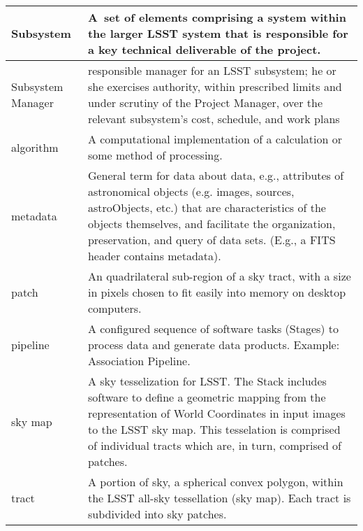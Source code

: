 \begin{longtable}{|l|p{}|}
Subsystem & A set of elements comprising a system within the larger LSST system that is responsible for a key technical deliverable of the project. \\\hline
Subsystem Manager & responsible manager for an LSST subsystem; he or she exercises authority, within prescribed limits and under scrutiny of the Project Manager, over the relevant subsystem's cost, schedule, and work plans \\\hline
algorithm & A computational implementation of a calculation or some method of processing. \\\hline
metadata & General term for data about data, e.g., attributes of astronomical objects (e.g. images, sources, astroObjects, etc.) that are characteristics of the objects themselves, and facilitate the organization, preservation, and query of data sets. (E.g., a FITS header contains metadata). \\\hline
patch & An quadrilateral sub-region of a sky tract, with a size in pixels chosen to fit easily into memory on desktop computers. \\\hline
pipeline & A configured sequence of software tasks (Stages) to process data and generate data products. Example: Association Pipeline. \\\hline
sky map & A sky tesselization for LSST. The Stack includes software to define a geometric mapping from the representation of World Coordinates in input images to the LSST sky map. This tesselation is comprised of individual tracts which are, in turn, comprised of patches. \\\hline
tract & A portion of sky, a spherical convex polygon, within the LSST all-sky tessellation (sky map). Each tract is subdivided into sky patches. \\\hline
\end{longtable}
